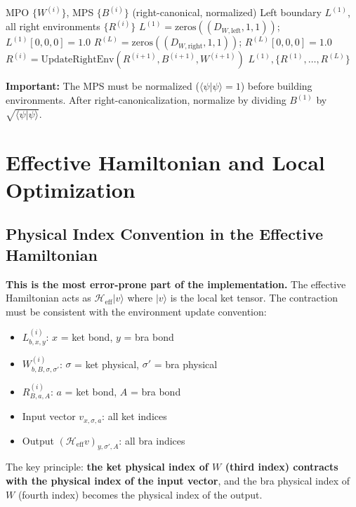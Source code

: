 \documentclass[aps,prb,onecolumn,scriptaddress]{revtex4-2}
\begin{document}
\begin{algorithm}[H]
\caption{InitializeEnvironments}
\begin{algorithmic}[1]
	\Require MPO $\{W^{(i)}\}$, MPS $\{B^{(i)}\}$ (right-canonical, normalized)
	\Ensure Left boundary $L^{(1)}$, all right environments $\{R^{(i)}\}$
	\State $L^{(1)} = \text{zeros}((D_{W,\text{left}}, 1, 1))$; \quad $L^{(1)}[0, 0, 0] = 1.0$
	\State $R^{(L)} = \text{zeros}((D_{W,\text{right}}, 1, 1))$; \quad $R^{(L)}[0, 0, 0] = 1.0$
	\State $R^{(i)} = \text{UpdateRightEnv}(R^{(i+1)}, B^{(i+1)}, W^{(i+1)})$
	\EndFor
	\State \Return $L^{(1)}, \{R^{(1)}, \ldots, R^{(L)}\}$
\end{algorithmic}
\end{algorithm}

\textbf{Important:} The MPS must be normalized ($\langle\psi|\psi\rangle = 1$) before building environments. After right-canonicalization, normalize by dividing $B^{(1)}$ by $\sqrt{\langle\psi|\psi\rangle}$.

\section{Effective Hamiltonian and Local Optimization}

\subsection{Physical Index Convention in the Effective Hamiltonian}

\textbf{This is the most error-prone part of the implementation.} The effective Hamiltonian acts as $\mathcal{H}_{\text{eff}} |v\rangle$ where $|v\rangle$ is the local ket tensor. The contraction must be consistent with the environment update convention:

\begin{itemize}
\item $L^{(i)}_{b, x, y}$: $x$ = ket bond, $y$ = bra bond
\item $W^{(i)}_{b, B, \sigma, \sigma'}$: $\sigma$ = ket physical, $\sigma'$ = bra physical
\item $R^{(i)}_{B, a, A}$: $a$ = ket bond, $A$ = bra bond
\item Input vector $v_{x, \sigma, a}$: all ket indices
\item Output $(\mathcal{H}_{\text{eff}} v)_{y, \sigma', A}$: all bra indices
\end{itemize}

The key principle: \textbf{the ket physical index of $W$ (third index) contracts with the physical index of the input vector}, and the bra physical index of $W$ (fourth index) becomes the physical index of the output.
\end{document}
